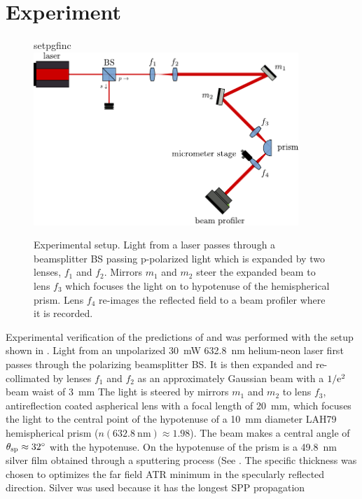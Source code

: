 \section{Experiment}
\begin{figure}[ht]
 \centering
 {setpgfinc}
 \includegraphics[keepaspectratio,width=10cm]{interference/figures/opticalsetup.pdf}
 \caption{Experimental setup.  Light from a laser passes
 through a beamsplitter BS passing p-polarized light which is expanded by two lenses, $f_1$ and $f_2$.
 Mirrors $m_1$ and $m_2$ steer the expanded beam to lens $f_3$ which
	focuses the light on to hypotenuse of the hemispherical prism.  Lens $f_4$ re-images the reflected
 field to a beam profiler where it is recorded.}
\label{fig:opticalsetup}
\end{figure}
Experimental verification of the predictions of 
and  was performed with the setup shown in
.  Light from an
unpolarized \SI{30}{\milli\watt} \SI{632.8}{\nano\meter} helium-neon
laser first passes through the polarizing
beamsplitter BS.  It is then expanded and re-collimated by lenses $f_1$ and $f_2$ as an
approximately Gaussian beam with a $1/{\mathrm{e}}^2$ beam waist of
\SI{3}{\milli\meter} The light is steered by mirrors $m_1$ and $m_2$ to
lens $f_3$, antireflection coated aspherical lens with a focal length of
\SI{20}{\milli\meter}, which
focuses the light to the central point of the hypotenuse of a
\SI{10}{\milli\meter} diameter LAH79 hemispherical prism
($n(\SI{632.8}{\nano\meter})\approx1.98$).  The beam makes a central angle
of $\theta_\mathrm{sp}\approx\SI{32}{\degree}$ with the hypotenuse.
On the hypotenuse of the prism is a \SI{49.8}{\nano\meter} silver film
obtained through a sputtering process (See .
The specific thickness was chosen to
optimizes the far field ATR minimum in the specularly reflected
direction.  Silver was used because it has the longest SPP propagation
